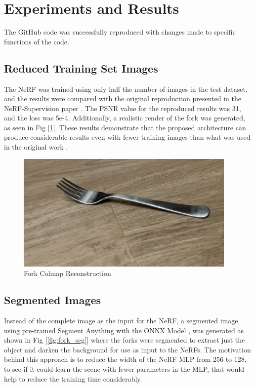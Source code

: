 \documentclass[conference]{IEEEtran}
\begin{document}
\section{Experiments and Results}
The GitHub code \cite{yen2022nerfsupervision} was successfully reproduced with changes made to specific functions of the code.

\subsection{Reduced Training Set Images}
The NeRF was trained using only half the number of images in the test dataset, and the results were compared with the original reproduction presented in the NeRF-Supervision paper \cite{yen2022nerfsupervision}. The PSNR value for the reproduced results was 31, and the loss was 5e-4. Additionally, a realistic render of the fork was generated, as seen in Fig [\ref{fig:fork_result}]. These results demonstrate that the proposed architecture can produce considerable results even with fewer training images than what was used in the original work \cite{yen2022nerfsupervision}.

\begin{figure} [h]
\centering
  \includegraphics[scale = 0.55]{figures/results/fork-result.png}  
  \caption{\label{fig:fork_result} Fork Colmap Reconstruction}
\end{figure}


\subsection{Segmented Images}
Instead of the complete image as the input for the NeRF, a segmented image using pre-trained Segment Anything with the ONNX Model \cite{kirillov2023segment}, was generated as shown in Fig [\ref{fig:fork_seg}] where  the forks were segmented to extract just the object and darken the background for use as input to the NeRFs. The motivation behind this approach is to reduce the width of the NeRF MLP from 256 to 128, to see if it could learn the scene with fewer parameters in the MLP, that would help to reduce the training time considerably.
\end{document}

